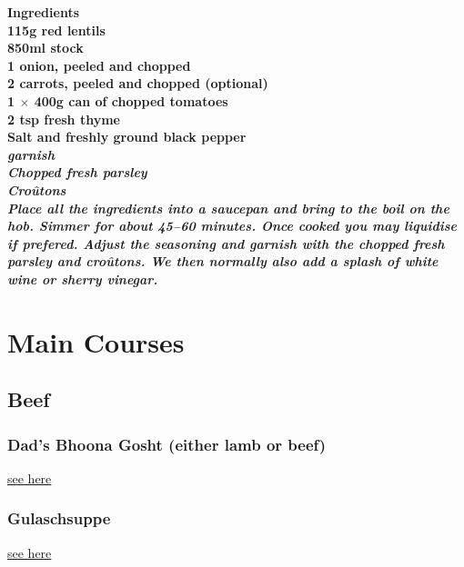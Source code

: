 \documentclass[18pt, oneside]{book}
\begin{document}
\bf{Ingredients} \normalfont \\
115g red lentils \\
850ml stock \\
1 onion, peeled and chopped \\
2 carrots, peeled and chopped (optional)\\
1 $\times$ 400g can of chopped tomatoes \\
2 tsp fresh thyme \\
Salt and freshly ground black pepper \\


\it{garnish} \normalfont \\
Chopped fresh parsley \\
Cro\^{u}tons \\

Place all the ingredients into a saucepan and bring to the boil on the hob. Simmer for about 45--60 minutes. Once cooked you may liquidise if prefered. Adjust the seasoning and garnish with the chopped fresh parsley and cro\^{u}tons. We then normally also add a splash of white wine or sherry vinegar. 





\part{Main Courses}
\setcounter{chapter}{0}
\chapter{Beef}

\section{Dad's Bhoona Gosht (either lamb or beef)}
\hyperref[bhoona]{see here}

\section{Gulaschsuppe}
\hyperref[gulasch]{see here}
\end{document}
